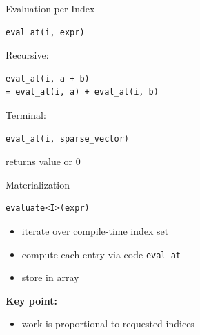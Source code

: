 \documentclass{beamer}
\begin{document}
\begin{frame}[fragile]{Evaluation per Index}
\begin{lstlisting}
eval_at(i, expr)
\end{lstlisting}

\vspace{1em}

Recursive:

\begin{lstlisting}
eval_at(i, a + b)
= eval_at(i, a) + eval_at(i, b)
\end{lstlisting}

\vspace{1em}

Terminal:

\begin{lstlisting}
eval_at(i, sparse_vector)
\end{lstlisting}

returns value or 0

\end{frame}


\begin{frame}[fragile]{Materialization}
\begin{lstlisting}
evaluate<I>(expr)
\end{lstlisting}

\vspace{1em}

\begin{itemize}
\item iterate over compile-time index set
\item compute each entry via code \lstinline!eval_at!
\item store in array
\end{itemize}

\vspace{1em}

\textbf{Key point:}
\begin{itemize}
\item work is proportional to requested indices
\end{itemize}

\end{frame}
\end{document}

